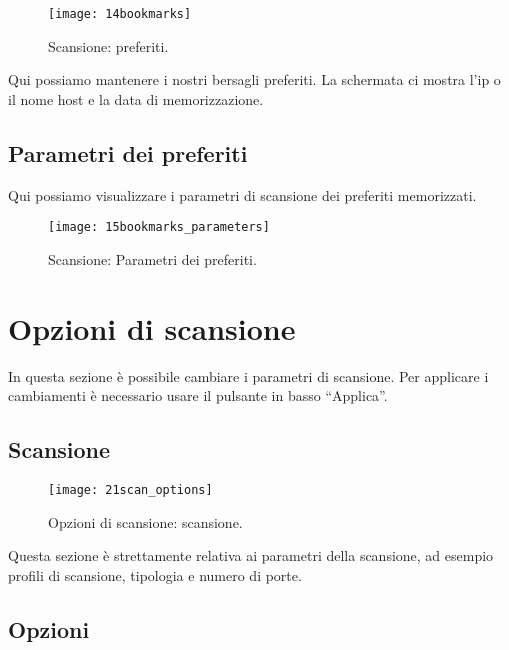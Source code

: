 \begin{figure}[h]
  \centering
  \texttt{[image: 14bookmarks]}
  \caption{Scansione: preferiti.}
  \label{fig:ContentsScanBookmarks}
\end{figure}
Qui possiamo mantenere i nostri bersagli preferiti. La schermata ci mostra l'ip 
o il nome host e la data di memorizzazione.

\subsection{Parametri dei preferiti}
\label{sec:ContentsScanBookmarksParameters}

Qui possiamo visualizzare i parametri di scansione dei preferiti memorizzati.
\begin{figure}[h]
  \centering
  \texttt{[image: 15bookmarks\_parameters]}
  \caption{Scansione: Parametri dei preferiti.}
  \label{fig:ContentsScanBookmarksParameters}
\end{figure}


\section{Opzioni di scansione}
\label{sec:ContentsScanOptions}

In questa sezione \`e possibile cambiare i parametri di scansione. Per applicare 
i cambiamenti \`e necessario usare il pulsante in basso ``Applica''.

\subsection{Scansione}
\label{sec:ContentsScanOptionsScanParameters}

\begin{figure}[h]
  \centering
  \texttt{[image: 21scan\_options]}
  \caption{Opzioni di scansione: scansione.}
  \label{fig:ContentsScanOptionsScanParameters}
\end{figure}
Questa sezione \`e strettamente relativa ai parametri della scansione, ad 
esempio profili di scansione, tipologia e numero di porte.

\subsection{Opzioni}
\label{sec:ContentsScanOptionsScanParamOptions}

